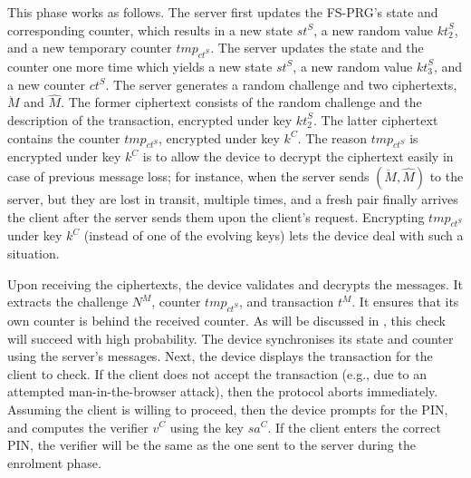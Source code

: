 \documentclass[runningheads]{llncs}
\newcommand{\sss}{\scriptscriptstyle}
\newcommand{\nonce}{\ensuremath{{N}}}
\newcommand{\keyt}{\ensuremath{{kt}}}
\newcommand{\counter}{\ensuremath{{ct}}}
\newcommand{\salt}{\ensuremath{{sa}}}
\newcommand{\trans}{\ensuremath{{t}}}
\renewcommand{\verifier}{\ensuremath{{v}}}
\renewcommand{\state}{\ensuremath{{st}}}
\newcommand{\VC}[1]{\ensuremath{#1^{\sss C}}}
\newcommand{\VS}[1]{\ensuremath{#1^{\sss S}}}
\newcommand{\VM}[1]{\ensuremath{#1^{\sss M}}}
\newcommand{\tmp}{\ensuremath{{tmp}}}
\begin{document}
This phase works as follows. The server first updates the FS-PRG's state and corresponding counter, which results in a new state \VS{\state}, a new random value  \VS{\keyt_{\sss 2}}, and a new temporary counter $\tmp_{\VS{\counter}}$. The server updates the state and the counter one more time which yields a new state \VS{\state}, a new random value \VS{\keyt_{\sss 3}}, and a new counter \VS{\counter}. The server generates a random challenge and two ciphertexts, $\ddot M$ and $\hat M$. The former ciphertext consists of the random challenge and the description of the transaction, encrypted under key \VS{\keyt_{\sss 2}}. The latter ciphertext contains the counter $\tmp_{\VS{\counter}}$, encrypted under key $\VC{k}$. The reason $\tmp_{\VS{\counter}}$ is encrypted under key $\VC{k}$ is to allow the device to decrypt the ciphertext easily 
in case of previous message loss; for instance, when the server sends $(\ddot M, \hat M)$ to the server, but they are lost in transit, multiple times, and a fresh pair finally arrives the client after the server sends them upon the client's request. Encrypting $\tmp_{\VS{\counter}}$ under key $\VC{k}$ (instead of one of the evolving keys) lets the device deal with such a situation. 




Upon receiving the ciphertexts, the device validates and decrypts the messages. It extracts the challenge \VM{\nonce}, counter $\tmp_{\VS{\counter}}$, and transaction \VM{\trans}. It ensures that its own counter is behind the received counter. As will be discussed in , this check will succeed with high probability. The device synchronises its state and counter using the server's messages. Next, the device displays the transaction for the client to check. If the client does not accept the transaction (e.g., due to an attempted man-in-the-browser attack), then the protocol aborts immediately. Assuming the client is willing to proceed, then the device prompts for the PIN, and computes the verifier \VC{\verifier} using the key \VC{\salt}. If the client enters the correct PIN, the verifier will be the same as the one sent to the server during the enrolment phase.
\end{document}
